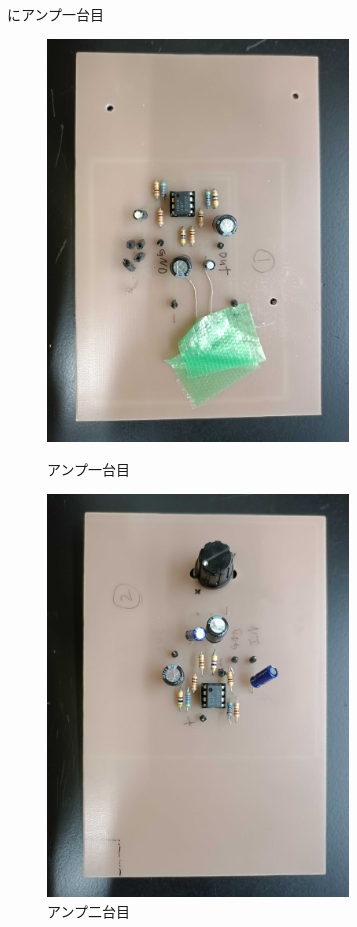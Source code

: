 \documentclass[report.tex]{subfiles}
\begin{document}
にアンプ一台目

\begin{figure}[H]
	\begin{minipage}[b]{0.5\linewidth}
		\centering
		\includegraphics[width=8cm]{use/2.jpg}
		\caption{アンプ一台目}
		\label{fig:s_2}
	\end{minipage}
	\begin{minipage}[b]{0.5\linewidth}
		\centering
		\includegraphics[width=8cm]{use/3.jpg}
		\caption{アンプ二台目}
		\label{fig:s_3}
	\end{minipage}
\end{figure}
\end{document}
